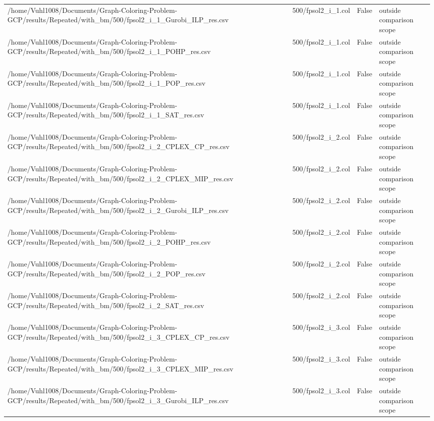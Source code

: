 \begin{table}[htbp]
\begin{tabular}{llll}
/home/Vuhl1008/Documents/Graph-Coloring-Problem-GCP/results/Repeated/with\_bm/500/fpsol2\_i\_1\_Gurobi\_ILP\_res.csv & 500/fpsol2\_i\_1.col & False & outside comparison scope \\
/home/Vuhl1008/Documents/Graph-Coloring-Problem-GCP/results/Repeated/with\_bm/500/fpsol2\_i\_1\_POHP\_res.csv & 500/fpsol2\_i\_1.col & False & outside comparison scope \\
/home/Vuhl1008/Documents/Graph-Coloring-Problem-GCP/results/Repeated/with\_bm/500/fpsol2\_i\_1\_POP\_res.csv & 500/fpsol2\_i\_1.col & False & outside comparison scope \\
/home/Vuhl1008/Documents/Graph-Coloring-Problem-GCP/results/Repeated/with\_bm/500/fpsol2\_i\_1\_SAT\_res.csv & 500/fpsol2\_i\_1.col & False & outside comparison scope \\
/home/Vuhl1008/Documents/Graph-Coloring-Problem-GCP/results/Repeated/with\_bm/500/fpsol2\_i\_2\_CPLEX\_CP\_res.csv & 500/fpsol2\_i\_2.col & False & outside comparison scope \\
/home/Vuhl1008/Documents/Graph-Coloring-Problem-GCP/results/Repeated/with\_bm/500/fpsol2\_i\_2\_CPLEX\_MIP\_res.csv & 500/fpsol2\_i\_2.col & False & outside comparison scope \\
/home/Vuhl1008/Documents/Graph-Coloring-Problem-GCP/results/Repeated/with\_bm/500/fpsol2\_i\_2\_Gurobi\_ILP\_res.csv & 500/fpsol2\_i\_2.col & False & outside comparison scope \\
/home/Vuhl1008/Documents/Graph-Coloring-Problem-GCP/results/Repeated/with\_bm/500/fpsol2\_i\_2\_POHP\_res.csv & 500/fpsol2\_i\_2.col & False & outside comparison scope \\
/home/Vuhl1008/Documents/Graph-Coloring-Problem-GCP/results/Repeated/with\_bm/500/fpsol2\_i\_2\_POP\_res.csv & 500/fpsol2\_i\_2.col & False & outside comparison scope \\
/home/Vuhl1008/Documents/Graph-Coloring-Problem-GCP/results/Repeated/with\_bm/500/fpsol2\_i\_2\_SAT\_res.csv & 500/fpsol2\_i\_2.col & False & outside comparison scope \\
/home/Vuhl1008/Documents/Graph-Coloring-Problem-GCP/results/Repeated/with\_bm/500/fpsol2\_i\_3\_CPLEX\_CP\_res.csv & 500/fpsol2\_i\_3.col & False & outside comparison scope \\
/home/Vuhl1008/Documents/Graph-Coloring-Problem-GCP/results/Repeated/with\_bm/500/fpsol2\_i\_3\_CPLEX\_MIP\_res.csv & 500/fpsol2\_i\_3.col & False & outside comparison scope \\
/home/Vuhl1008/Documents/Graph-Coloring-Problem-GCP/results/Repeated/with\_bm/500/fpsol2\_i\_3\_Gurobi\_ILP\_res.csv & 500/fpsol2\_i\_3.col & False & outside comparison scope \\

\end{tabular}
\end{table}
